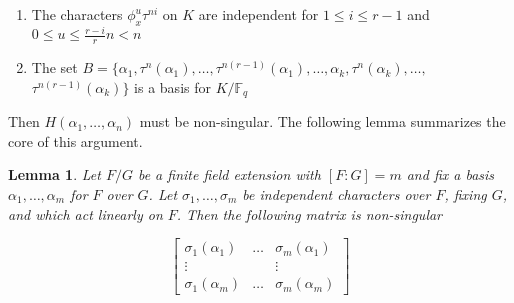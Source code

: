 \documentclass[sigconf]{acmart}
\newtheorem{lemma}{Lemma}
\newcommand{\F}{\mathbb{F}}
\begin{document}
\begin{enumerate}
    \item The characters $\phi_x^{u}\tau^{ni}$ on $K$ are independent for $1 \leq i \leq r-1$ and $0 \leq u \leq  \frac{r-i}{r} n < n$ 
    \item The set $B = \{\alpha_1, \tau^n(\alpha_1), \ldots , \tau^{n(r - 1)}(\alpha_1), \ldots , \alpha_k, \tau^n(\alpha_k), \ldots , $
    $\tau^{n(r - 1)}(\alpha_k) \}$ is a basis for $K/\F_q$
\end{enumerate} 

Then $H(\alpha_1, \ldots, \alpha_{n})$ must be non-singular. The following lemma summarizes the core of this argument.

\begin{lemma}\label{charindlem}
Let $F/G$ be a finite field extension with $[F:G] = m$ and fix a basis $\alpha_1, \ldots, \alpha_m$ for $F$ over $G$. Let $\sigma_1, \ldots, \sigma_m$ be independent characters over $F$, fixing $G$, and which act linearly on $F$. Then the following matrix is non-singular

\begin{equation*}
 \begin{bmatrix}
\sigma_1(\alpha_1) & \ldots & \sigma_m(\alpha_1) \\ \vdots & & \vdots \\ \sigma_1(\alpha_m) & \ldots & \sigma_m(\alpha_m) 
\end{bmatrix}   
\end{equation*}


\end{lemma}
\end{document}

